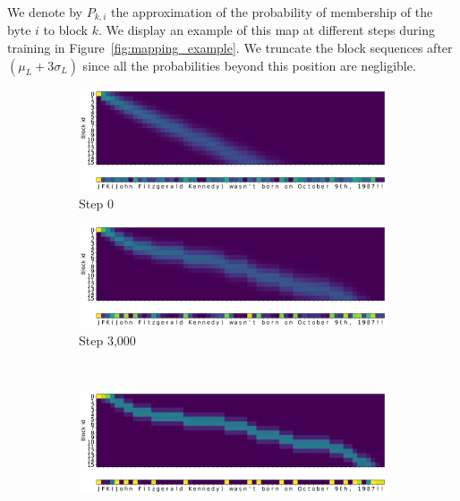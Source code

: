 We denote by $P_{k,i}$ the approximation of the probability of membership of the byte $i$ to block $k$. We display an example of this map at different steps during training in Figure~\ref{fig:mapping_example}. We truncate the block sequences after $(\mu_L + 3\sigma_L)$ since all the probabilities beyond this position are negligible.

\iffalse
\begin{figure}
    \centering\small
    \begin{subfigure}[b]{0.4\textwidth}
    \includegraphics[width=\linewidth]{sources/part_2/manta/images/mapping_example_0.png}
    \caption{Step 0}
    \end{subfigure}\hfill
    \begin{subfigure}[b]{0.4\textwidth}
    \includegraphics[width=\linewidth]{sources/part_2/manta/images/mapping_example_3000.png}
    \caption{Step 3,000}
    \end{subfigure}
    \begin{subfigure}[b]{0.90\textwidth}
    ~
    \end{subfigure}
    \begin{subfigure}[b]{0.4\textwidth}
    \includegraphics[width=\linewidth]{sources/part_2/manta/images/mapping_example_7000.png}

\end{subfigure}
\end{figure}
